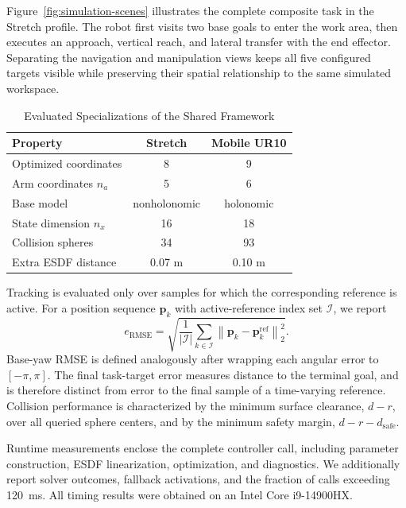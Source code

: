 \documentclass[conference]{IEEEtran}
\newcommand{\vect}[1]{\boldsymbol{#1}}
\begin{document}
Figure~\ref{fig:simulation-scenes} illustrates the complete composite task in
the Stretch profile.  The robot first visits two base goals to enter the work
area, then executes an approach, vertical reach, and lateral transfer with the
end effector.  Separating the navigation and manipulation views keeps all five
configured targets visible while preserving their spatial relationship to the
same simulated workspace.

\begin{table}[t]
  \caption{Evaluated Specializations of the Shared Framework}
  \label{tab:platform-models}
  \centering
  \small
  \begin{tabular*}{\columnwidth}{@{\extracolsep{\fill}}lcc@{}}
    \toprule
    Property & Stretch & Mobile UR10 \\
    \midrule
    Optimized coordinates & 8 & 9 \\
    Arm coordinates $n_a$ & 5 & 6 \\
    Base model & nonholonomic & holonomic \\
    State dimension $n_x$ & 16 & 18 \\
    Collision spheres & 34 & 93 \\
    Extra ESDF distance & 0.07 m & 0.10 m \\
    \bottomrule
  \end{tabular*}
\end{table}

Tracking is evaluated only over samples for which the corresponding reference
is active.  For a position sequence $\vect{p}_k$ with active-reference index
set $\mathcal{I}$, we report
\begin{equation}
e_{\mathrm{RMSE}}=
\sqrt{\frac{1}{|\mathcal{I}|}\sum_{k\in\mathcal{I}}
\left\|\vect{p}_k-\vect{p}^{\mathrm{ref}}_k\right\|_2^2}.
\label{eq:position-rmse}
\end{equation}
Base-yaw RMSE is defined analogously after wrapping each angular error to
$[-\pi,\pi]$.  The final task-target error measures distance to the terminal
goal, and is therefore distinct from error to the final sample of a
time-varying reference.  Collision performance is characterized by the
minimum surface clearance, $d-r$, over all queried sphere centers, and by the
minimum safety margin, $d-r-d_{\mathrm{safe}}$.

Runtime measurements enclose the complete controller call, including
parameter construction, ESDF linearization, optimization, and diagnostics.
We additionally report solver outcomes, fallback activations, and the fraction
of calls exceeding 120~ms.  All timing results
were obtained on an Intel Core i9-14900HX.
\end{document}
